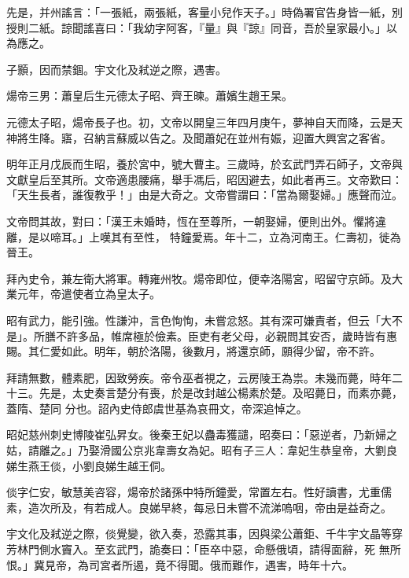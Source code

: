 \begin{pinyinscope}
 先是，并州謠言：「一張紙，兩張紙，客量小兒作天子。」時偽署官告身皆一紙，別授則二紙。諒聞謠喜曰：「我幼字阿客，『量』與『諒』同音，吾於皇家最小。」以為應之。



 子顥，因而禁錮。宇文化及弒逆之際，遇害。



 煬帝三男：蕭皇后生元德太子昭、齊王暕。蕭嬪生趙王杲。



 元德太子昭，煬帝長子也。初，文帝以開皇三年四月庚午，夢神自天而降，云是天神將生降。寤，召納言蘇威以告之。及聞蕭妃在並州有娠，迎置大興宮之客省。



 明年正月戊辰而生昭，養於宮中，號大曹主。三歲時，於玄武門弄石師子，文帝與文獻皇后至其所。文帝適患腰痛，舉手馮后，昭因避去，如此者再三。文帝歎曰：「天生長者，誰復教乎！」由是大奇之。文帝嘗謂曰：「當為爾娶婦。」應聲而泣。



 文帝問其故，對曰：「漢王未婚時，恆在至尊所，一朝娶婦，便則出外。懼將違離，是以啼耳。」上嘆其有至性，
 特鐘愛焉。年十二，立為河南王。仁壽初，徙為晉王。



 拜內史令，兼左衛大將軍。轉雍州牧。煬帝即位，便幸洛陽宮，昭留守京師。及大業元年，帝遣使者立為皇太子。



 昭有武力，能引強。性謙沖，言色恂恂，未嘗忿怒。其有深可嫌責者，但云「大不是」。所膳不許多品，帷席極於儉素。臣吏有老父母，必親問其安否，歲時皆有惠賜。其仁愛如此。明年，朝於洛陽，後數月，將還京師，願得少留，帝不許。



 拜請無數，體素肥，因致勞疾。帝令巫者視之，云房陵王為祟。未幾而薨，時年二十三。先是，太史奏言楚分有喪，於是改封越公楊素於楚。及昭薨日，而素亦薨，蓋隋、楚同
 分也。詔內史侍郎虞世基為哀冊文，帝深追悼之。



 昭妃慈州刺史博陵崔弘昇女。後秦王妃以蠱毒獲譴，昭奏曰：「惡逆者，乃新婦之姑，請離之。」乃娶滑國公京兆韋壽女為妃。昭有子三人：韋妃生恭皇帝，大劉良娣生燕王倓，小劉良娣生越王侗。



 倓字仁安，敏慧美咨容，煬帝於諸孫中特所鐘愛，常置左右。性好讀書，尤重儒素，造次所及，有若成人。良娣早終，每忌日未嘗不流涕嗚咽，帝由是益奇之。



 宇文化及弒逆之際，倓覺變，欲入奏，恐露其事，因與梁公蕭鉅、千牛宇文晶等穿芳林門側水竇入。至玄武門，詭奏曰：「臣卒中惡，命懸俄頃，請得面辭，死
 無所恨。」冀見帝，為司宮者所遏，竟不得聞。俄而難作，遇害，時年十六。




\end{pinyinscope}
